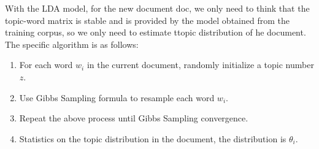 With the LDA model, for the new document doc, we only need to think that the topic-word matrix is stable and is provided by the model obtained from the training corpus, so we only need to estimate ttopic distribution of he document. The specific algorithm is as follows:
\begin{enumerate}
  \item  For each word $w_i$ in the current document, randomly initialize a topic number $z$.
  \item Use Gibbs Sampling formula to resample each word $w_i$.
  \item  Repeat the above process until Gibbs Sampling convergence.
  \item Statistics on the topic distribution in the document, the distribution is $\theta_i$.
\end{enumerate}
